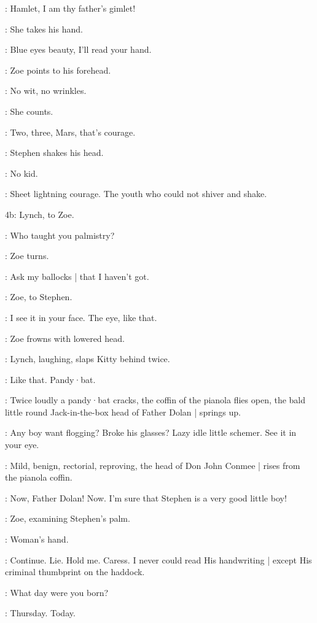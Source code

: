\Zoe:
Hamlet,
I am thy father's gimlet!

:
She takes his hand.

\Zoe:
Blue eyes beauty,
I'll read your hand.

:
Zoe points to his forehead.

\Zoe:
No wit,
no wrinkles.

:
She counts.

\Zoe:
Two,
three,
Mars,
that's courage.

:
Stephen shakes his head.

\Zoe:
No kid.

\Lynch:
Sheet lightning courage.
The youth who could not shiver and shake.

\N4b:
Lynch, to Zoe.

\Lynch:
Who taught you palmistry?

:
Zoe turns.

\Zoe:
Ask my ballocks |
that I haven't got.

:
Zoe,
to Stephen.

\Zoe:
I see it in your face.
The eye,
like that.

:
Zoe frowns with lowered head.

:
Lynch,
laughing,
slaps Kitty behind twice.

\Lynch:
Like that.
Pandy·bat.

:
Twice loudly a pandy·bat cracks,
the coffin of the pianola flies open,
the bald little round Jack-in-the-box head of Father Dolan |
springs up.

\FatherDolan:
Any boy want flogging?
Broke his glasses?
Lazy idle little schemer.
See it in your eye.

:
Mild,
benign,
rectorial,
reproving,
the head of Don John Conmee |
rises from the pianola coffin.

\DonJohnConmee:
Now,
Father Dolan!
Now.
I'm sure that Stephen is a very good little boy!

:
Zoe,
examining Stephen's palm.

\Zoe:
Woman's hand.

\Stephen:
Continue.
Lie.
Hold me.
Caress.
I never could read His handwriting |
except His criminal thumbprint on the haddock.

\Zoe:
What day were you born?

\Stephen:
Thursday.
Today.

